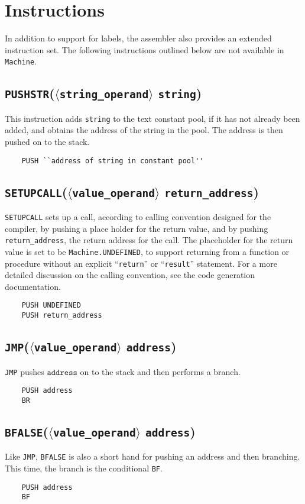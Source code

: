 \documentclass[oneside]{amsart}
\theoremstyle{definition}
\theoremstyle{remark}
\numberwithin{equation}{section}
\begin{document}
\section{Instructions}
In addition to support for labels, the assembler also provides an extended instruction set. The
following instructions outlined below are not available in \texttt{Machine}.
\subsection{\texttt{PUSHSTR}(\texttt{$\langle$string_operand$\rangle$} \texttt{string})}
This instruction adds \texttt{string} to the text constant pool, if it has not already been
added, and obtains the address of the string in the pool. The address is then pushed on to the
stack.
\begin{lstlisting}
    PUSH ``address of string in constant pool''
\end{lstlisting}
\subsection{\texttt{SETUPCALL}(\texttt{$\langle$value_operand$\rangle$} \texttt{return_address})}
\texttt{SETUPCALL} sets up a call, according to calling convention designed for the compiler, by
pushing a place holder for the return value, and by pushing \texttt{return_address}, the return
address for the call. The placeholder for the return value is set to be \texttt{Machine.UNDEFINED},
to support returning from a function or procedure without an explicit ``\texttt{return}'' or
``\texttt{result}'' statement. For a more detailed discussion on the calling convention, see the
code generation documentation.
\begin{lstlisting}
    PUSH UNDEFINED
    PUSH return_address
\end{lstlisting}
\subsection{\texttt{JMP}(\texttt{$\langle$value_operand$\rangle$} \texttt{address})}
\texttt{JMP} pushes $\texttt{address}$ on to the stack and then performs a branch.
\begin{lstlisting}
    PUSH address
    BR
\end{lstlisting}
\subsection{\texttt{BFALSE}(\texttt{$\langle$value_operand$\rangle$} \texttt{address})}
Like \texttt{JMP}, \texttt{BFALSE} is also a short hand for pushing an address and then branching.
This time, the branch is the conditional \texttt{BF}.
\begin{lstlisting}
    PUSH address
    BF
\end{lstlisting}
\end{document}

